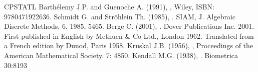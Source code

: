 \documentclass[a4paper,10pt,english]{sphinxhowto}
\begin{document}
\begin{sphinxthebibliography}{CPSTAT\sphinxhyphen{}L}
Barthélemy J.\sphinxhyphen{}P. and Guenoche A. (1991), , Wiley, ISBN: 978\sphinxhyphen{}0471922636.
Schmidt G. and Ströhlein Th. (1985), . SIAM, J. Algebraic Discrete Methods, 6, 1985, 54\textendash{}65.
Berge C. (2001), . Dover Publications Inc. 2001. First published in English by Methuen \& Co Ltd., London 1962. Translated from a French edition by Dunod, Paris 1958.
Kruskal J.B. (1956), , Proceedings of the American Mathematical Society. 7: 48\textendash{}50.
Kendall M.G. (1938), . Biometrica 30:81\textendash{}93
\end{sphinxthebibliography}



\renewcommand{\indexname}{Index}
\printindex
\end{document}
